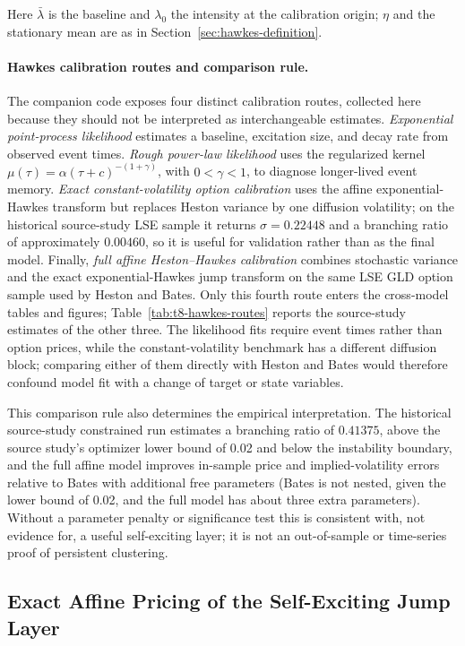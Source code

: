 Here \(\bar\lambda\) is the baseline and \(\lambda_0\) the intensity at the calibration origin; \(\eta\) and the stationary mean are as in Section~\ref{sec:hawkes-definition}.

\paragraph{Hawkes calibration routes and comparison rule.}
The companion code exposes four distinct calibration routes, collected here because they should not be interpreted as interchangeable estimates. \emph{Exponential point-process likelihood} estimates a baseline, excitation size, and decay rate from observed event times. \emph{Rough power-law likelihood} uses the regularized kernel \(\mu(\tau)=\alpha(\tau+c)^{-(1+\gamma)}\), with \(0<\gamma<1\), to diagnose longer-lived event memory. \emph{Exact constant-volatility option calibration} uses the affine exponential-Hawkes transform but replaces Heston variance by one diffusion volatility; on the historical source-study LSE sample it returns \(\sigma=0.22448\) and a branching ratio of approximately \(0.00460\), so it is useful for validation rather than as the final model. Finally, \emph{full affine Heston--Hawkes calibration} combines stochastic variance and the exact exponential-Hawkes jump transform on the same LSE GLD option sample used by Heston and Bates. Only this fourth route enters the cross-model tables and figures; Table~\ref{tab:t8-hawkes-routes} reports the source-study estimates of the other three. The likelihood fits require event times rather than option prices, while the constant-volatility benchmark has a different diffusion block; comparing either of them directly with Heston and Bates would therefore confound model fit with a change of target or state variables.

This comparison rule also determines the empirical interpretation. The historical source-study constrained run estimates a branching ratio of \(0.41375\), above the source study's optimizer lower bound of 0.02 and below the instability boundary, and the full affine model improves in-sample price and implied-volatility errors relative to Bates with additional free parameters (Bates is not nested, given the lower bound of 0.02, and the full model has about three extra parameters). Without a parameter penalty or significance test this is consistent with, not evidence for, a useful self-exciting layer; it is not an out-of-sample or time-series proof of persistent clustering.
\subsection{Exact Affine Pricing of the Self-Exciting Jump Layer}

